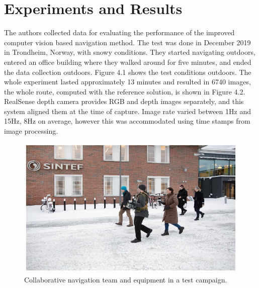 \chapter{Experiments and Results}
\setcounter{equation}{0}
The authors collected data for evaluating the performance of the
improved computer vision based navigation method. The test
was done in December 2019 in Trondheim, Norway, with
snowy conditions. They started navigating outdoors, entered an
office building where they walked around for five minutes, and
ended the data collection outdoors. Figure 4.1 shows the test
conditions outdoors. The whole experiment lasted approximately 13 minutes and resulted in 6740 images, the whole
route, computed with the reference solution, is shown in
Figure 4.2. RealSense depth camera provides RGB and depth
images separately, and this system aligned them at the time
of capture. Image rate varied between 1Hz and 15Hz, 8Hz on
average, however this was accommodated using time stamps
from image processing.\\
\begin{figure}
    \centering
    \includegraphics{fig10.jpg}
    \caption{Collaborative navigation team and equipment in a test
campaign.}
    
\end{figure}   
